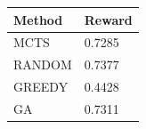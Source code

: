 \begin{tabular}{ll}
\hline
Method & Reward \\
\hline
  MCTS & 0.7285 \\
  RANDOM & 0.7377 \\
  GREEDY & 0.4428 \\
  GA & 0.7311 \\
\hline
\end{tabular}
